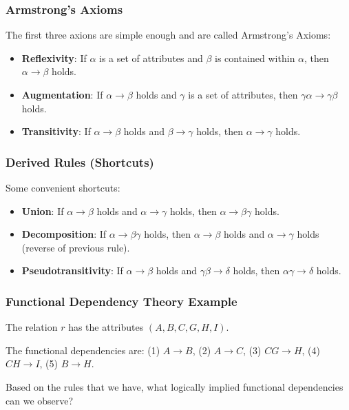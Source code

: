 \begin{frame}
\frametitle{Armstrong's Axioms}
The first three axions are simple enough and are called \alert{Armstrong's Axioms}:

\begin{itemize}
	\item \textbf{Reflexivity}: If $\alpha$ is a set of attributes and $\beta$ is contained within $\alpha$, then $\alpha \rightarrow \beta$ holds.
	\item \textbf{Augmentation}: If $\alpha \rightarrow \beta$ holds and $\gamma$ is a set of attributes, then $\gamma\alpha \rightarrow \gamma\beta$ holds.
	\item \textbf{Transitivity}: If $\alpha \rightarrow \beta$ holds and $\beta \rightarrow \gamma$ holds, then $\alpha \rightarrow \gamma$ holds.
\end{itemize}

\end{frame}



\begin{frame}
\frametitle{Derived Rules (Shortcuts)}

Some convenient shortcuts:

\begin{itemize}
	\item \textbf{Union}: If $\alpha \rightarrow \beta$ holds and $\alpha \rightarrow \gamma$ holds, then $\alpha \rightarrow \beta\gamma$ holds.
	\item \textbf{Decomposition}: If $\alpha \rightarrow \beta\gamma$ holds, then  $\alpha \rightarrow \beta$ holds and $\alpha \rightarrow \gamma$ holds (reverse of previous rule).
	\item \textbf{Pseudotransitivity}: If $\alpha \rightarrow \beta$ holds and $\gamma\beta \rightarrow \delta$ holds, then $\alpha\gamma \rightarrow \delta$ holds.
\end{itemize}

\end{frame}


\begin{frame}
\frametitle{Functional Dependency Theory Example}

The relation $r$ has the attributes $(A, B, C, G, H, I)$. 

The functional dependencies are: (1) $A \rightarrow B$, (2) $A \rightarrow C$, (3) $CG \rightarrow H$, (4) $CH \rightarrow I$, (5) $B \rightarrow H$.

Based on the rules that we have, what logically implied functional dependencies can we observe? 

\end{frame}



